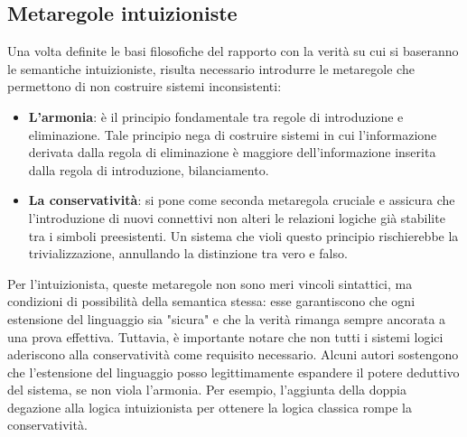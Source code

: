 \subsection{Metaregole intuizioniste}
Una volta definite le basi filosofiche del rapporto con la verità su cui si baseranno le semantiche intuizioniste, 
risulta necessario introdurre le metaregole che permettono di non costruire sistemi inconsistenti:
\begin{itemize}
    \item 
        \textbf{L'armonia}: è il principio fondamentale tra regole di introduzione e eliminazione. 
        Tale principio nega di costruire sistemi in cui l'informazione derivata dalla regola 
        di eliminazione è maggiore dell'informazione inserita dalla regola di introduzione, bilanciamento.
    \item 
        \textbf{La conservatività}: si pone come seconda metaregola cruciale e assicura che l'introduzione di nuovi 
        connettivi non alteri le relazioni logiche già stabilite tra i simboli preesistenti. Un sistema che 
        violi questo principio rischierebbe la trivializzazione, annullando la distinzione tra vero e falso.
\end{itemize}
Per l'intuizionista, queste metaregole non sono meri vincoli sintattici, ma condizioni di possibilità della semantica stessa: esse garantiscono che ogni estensione del linguaggio 
sia "sicura" e che la verità rimanga sempre ancorata a una prova effettiva. Tuttavia, è importante notare che non tutti i sistemi logici aderiscono alla conservatività come requisito 
necessario. Alcuni autori sostengono che l'estensione del linguaggio posso legittimamente espandere il potere deduttivo del sistema, se non viola l'armonia. Per esempio, l'aggiunta
della doppia degazione alla logica intuizionista per ottenere la logica classica rompe la conservatività.

